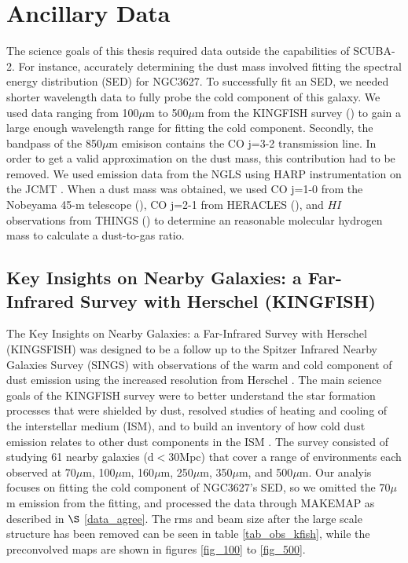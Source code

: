 \section{Ancillary Data}

The science goals of this thesis required data outside the capabilities of SCUBA-2.  For instance, accurately determining the dust mass involved fitting the spectral energy distribution (SED) for NGC3627.  To successfully fit an SED, we needed shorter wavelength data to fully probe the cold component of this galaxy. We used data ranging from 100$\mu$m to 500$\mu$m from the KINGFISH survey (\citep{kennicutt2011}) to gain a large enough wavelength range for fitting the cold component.  Secondly, the bandpass of the 850$\mu$m emisison contains the CO j=3-2 transmission line.  In order to get a valid approximation on the dust mass, this contribution had to be removed.  We used emission data from the NGLS using HARP instrumentation on the JCMT \citep{wilson2012}.  When a dust mass was obtained, we used CO j=1-0 from the Nobeyama 45-m telescope (\citep{kuno2007}), CO j=2-1 from HERACLES (\citep{leroy2009}), and $HI$ observations from THINGS (\citep{walter2008}) to determine an reasonable molecular hydrogen mass to calculate a dust-to-gas ratio.

\subsection{Key Insights on Nearby Galaxies: a Far-Infrared Survey with Herschel (KINGFISH)}


The Key Insights on Nearby Galaxies: a Far-Infrared Survey with Herschel (KINGSFISH) was designed to be a follow up to the Spitzer Infrared Nearby Galaxies Survey (SINGS) \citep{kennicutt2003} with observations of the warm and cold component of dust emission using the increased resolution from Herschel \citep{kennicutt2011}.  The main science goals of the KINGFISH survey were to better understand the star formation processes that were shielded by dust, resolved studies of heating and cooling of the interstellar medium (ISM), and to build an inventory of how cold dust emission relates to other dust components in the ISM \citep{kennicutt2011}.  The survey consisted of studying 61 nearby galaxies (d$<$30Mpc) that cover a range of environments each observed at 70$\mu$m, 100$\mu$m, 160$\mu$m, 250$\mu$m, 350$\mu$m, and 500$\mu$m.  Our analyis focuses on fitting the cold component of NGC3627's SED, so we omitted the 70$\mu$m emission from the fitting, and processed the data through MAKEMAP as described in $\S$ \ref{data_agree}.  The rms and beam size after the large scale structure has been removed can be seen in table \ref{tab_obs_kfish}, while the preconvolved maps are shown in figures \ref{fig_100} to \ref{fig_500}.


